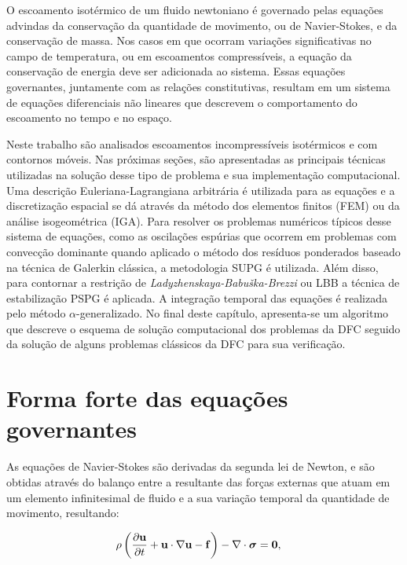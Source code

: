 \documentclass[tese_patricia]{subfiles}%
\begin{document}
O escoamento isotérmico de um fluido newtoniano é governado pelas equações advindas da conservação da quantidade de movimento, ou de Navier-Stokes, e da conservação de massa. Nos casos em que ocorram variações significativas no campo de temperatura, ou em escoamentos compressíveis, a equação da conservação de energia deve ser adicionada ao sistema. Essas equações governantes, juntamente com as relações constitutivas, resultam em um sistema de equações diferenciais não lineares que descrevem o comportamento do escoamento no tempo e no espaço. 

Neste trabalho são analisados escoamentos incompressíveis isotérmicos e com contornos móveis. Nas próximas seções, são apresentadas as principais técnicas utilizadas na solução desse tipo de problema e sua implementação computacional. Uma descrição Euleriana-Lagrangiana arbitrária é utilizada para as equações e a discretização espacial se dá através da método dos elementos finitos (FEM) ou da análise isogeométrica (IGA). Para resolver os problemas numéricos típicos desse sistema de equações, como as oscilações espúrias que ocorrem em problemas com convecção dominante quando aplicado o método dos resíduos ponderados baseado na técnica de Galerkin clássica, a metodologia SUPG é utilizada. Além disso, para contornar a restrição de \textit{Ladyzhenskaya-Babuška-Brezzi} ou LBB a técnica de estabilização PSPG é aplicada. A integração temporal das equações é realizada pelo método $\alpha$-generalizado. No final deste capítulo, apresenta-se um algoritmo que descreve o esquema de solução computacional dos problemas da DFC seguido da solução de alguns problemas clássicos da DFC para sua verificação.

\section{Forma forte das equações governantes} 

As equações de Navier-Stokes são derivadas da segunda lei de Newton, e são obtidas através do balanço entre a resultante das forças externas que atuam em um elemento infinitesimal de fluido e a sua variação temporal da quantidade de movimento, resultando:

\begin{align}
\rho\left(\frac{\partial\mathbf{u}}{\partial t} + \mathbf{u}\cdot\nabla\mathbf{u} - \mathbf{f} \right) - \nabla \cdot \boldsymbol{\sigma} &= \mathbf{0} , \label{eq:Navier-Stokes} 
\end{align}
\end{document}
